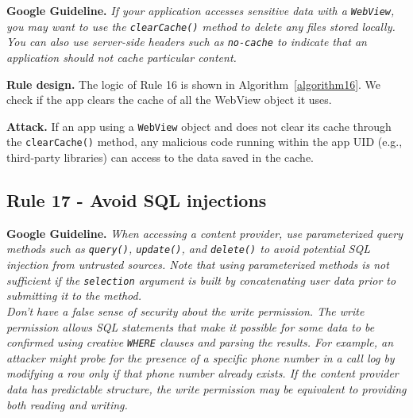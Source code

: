 \textbf{Google Guideline.} 
\emph{If your application accesses sensitive data with a \texttt{WebView}, you may want to use the \texttt{clearCache()} method to delete any files stored locally. You can also use server-side headers such as \texttt{no-cache} to indicate that an application should not cache particular content.}

\textbf{Rule design.} The logic of Rule 16 is shown in Algorithm~\ref{algorithm16}. We check if the app clears the cache of all the WebView object it uses. 

\setcounter{algocf}{15}
\begin{algorithm}[]
\SetAlgoLined
{}
\caption{}
\label{algorithm16}
\end{algorithm}

\textbf{Attack.} If an app using a \texttt{WebView} object and does not clear its cache through the \texttt{clearCache()} method, any malicious code running within the app UID (e.g., third-party libraries) can access to the data saved in the cache. 

\subsection{Rule 17 - Avoid SQL injections} 

\textbf{Google Guideline.} 
\emph{When accessing a content provider, use parameterized query methods such as \texttt{query()}, \texttt{update()}, and \texttt{delete()} to avoid potential SQL injection from untrusted sources. Note that using parameterized methods is not sufficient if the \texttt{selection} argument is built by concatenating user data prior to submitting it to the method.
\\
Don't have a false sense of security about the write permission. The write permission allows SQL statements that make it possible for some data to be confirmed using creative \texttt{WHERE} clauses and parsing the results. For example, an attacker might probe for the presence of a specific phone number in a call log by modifying a row only if that phone number already exists. If the content provider data has predictable structure, the write permission may be equivalent to providing both reading and writing.}

